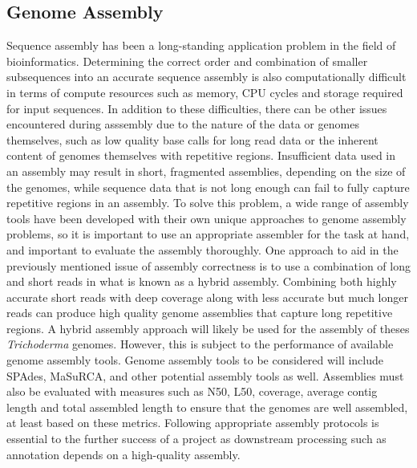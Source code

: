 \documentclass[12pt]{article}
\begin{document}
\subsection{Genome Assembly}

Sequence assembly has been a long-standing application problem in the
field of bioinformatics\cite{assembly}. Determining the correct order
and combination of smaller subsequences into an accurate sequence
assembly is also computationally difficult in terms of compute
resources such as memory, CPU cycles and storage required for input
sequences\cite{assembly}. In addition to these difficulties, there can
be other issues encountered during asssembly due to the nature of the
data or genomes themselves, such as low quality base calls for long
read data or the inherent content of genomes themselves with
repetitive regions. Insufficient data used in an assembly may result
in short, fragmented assemblies, depending on the size of the genomes,
while sequence data that is not long enough can fail to fully capture
repetitive regions in an assembly. To solve this problem, a wide range
of assembly tools have been developed with their own unique approaches
to genome assembly problems, so it is important to use an appropriate
assembler for the task at hand, and important to evaluate the assembly
thoroughly. One approach to aid in the previously mentioned issue of
assembly correctness is to use a combination of long and short reads
in what is known as a hybrid assembly. Combining both highly accurate
short reads with deep coverage along with less accurate but much
longer reads can produce high quality genome assemblies that capture
long repetitive regions. A hybrid assembly approach will likely be
used for the assembly of theses \textit{Trichoderma} genomes. However,
this is subject to the performance of available genome assembly
tools. Genome assembly tools to be considered will include
SPAdes\cite{spades}, MaSuRCA\cite{masurca}, and other potential
assembly tools as well.  Assemblies must also be evaluated with
measures such as N50, L50, coverage, average contig length and total
assembled length to ensure that the genomes are well assembled, at
least based on these metrics\cite{assembly}. Following appropriate
assembly protocols is essential to the further success of a project as
downstream processing such as annotation depends on a high-quality
assembly.
\end{document}
